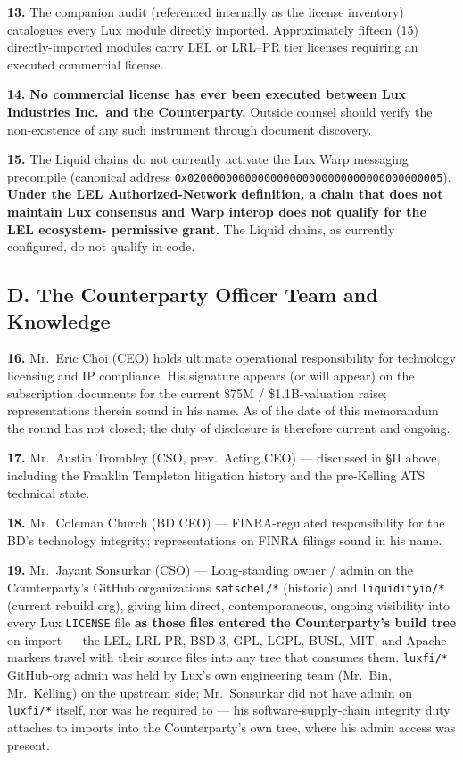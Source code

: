 \documentclass[11pt,letterpaper]{article}
\begin{document}
\textbf{13.} The companion audit (referenced internally as the
license inventory) catalogues every Lux module directly imported.
Approximately fifteen (15) directly-imported modules carry LEL or
LRL--PR tier licenses requiring an executed commercial license.

\textbf{14.} \textbf{No commercial license has ever been executed
between Lux Industries Inc.\ and the Counterparty.} Outside counsel
should verify the non-existence of any such instrument through
document discovery.

\textbf{15.} The Liquid chains do not currently activate the Lux
Warp messaging precompile (canonical address
\texttt{0x0200000000000000000000000000000000000005}). \textbf{Under
the LEL Authorized-Network definition, a chain that does not maintain
Lux consensus and Warp interop does not qualify for the LEL ecosystem-
permissive grant.} The Liquid chains, as currently configured, do
not qualify in code.

\subsection*{D. The Counterparty Officer Team and Knowledge}

\textbf{16.} Mr.\ Eric Choi (CEO) holds ultimate operational
responsibility for technology licensing and IP compliance. His
signature appears (or will appear) on the subscription documents for
the current \$75M / \$1.1B-valuation raise; representations therein
sound in his name. As of the date of this memorandum the round has
not closed; the duty of disclosure is therefore current and ongoing.

\textbf{17.} Mr.\ Austin Trombley (CSO, prev.\ Acting CEO) ---
discussed in \S II above, including the Franklin Templeton litigation
history and the pre-Kelling ATS technical state.

\textbf{18.} Mr.\ Coleman Church (BD CEO) --- FINRA-regulated
responsibility for the BD's technology integrity; representations on
FINRA filings sound in his name.

\textbf{19.} Mr.\ Jayant Sonsurkar (CSO) --- Long-standing owner /
admin on the Counterparty's GitHub organizations \texttt{satschel/*}
(historic) and \texttt{liquidityio/*} (current rebuild org), giving
him direct, contemporaneous, ongoing visibility into every Lux
\texttt{LICENSE} file \textbf{as those files entered the
Counterparty's build tree} on import --- the LEL, LRL-PR, BSD-3,
GPL, LGPL, BUSL, MIT, and Apache markers travel with their source
files into any tree that consumes them. \texttt{luxfi/*} GitHub-org
admin was held by Lux's own engineering team (Mr.\ Bin, Mr.\ Kelling)
on the upstream side; Mr.\ Sonsurkar did not have admin on
\texttt{luxfi/*} itself, nor was he required to --- his
software-supply-chain integrity duty attaches to imports into the
Counterparty's own tree, where his admin access was present.
\end{document}
